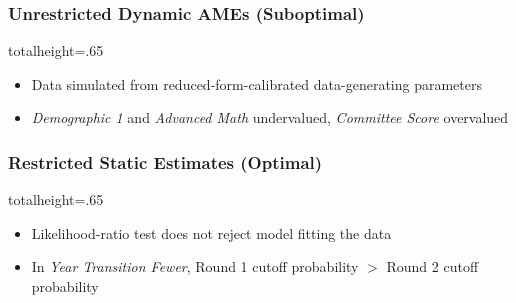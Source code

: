 \documentclass[12pt, aspectratio=169]{beamer}
\begin{document}
\begin{frame}[label=ydues]
\frametitle{Unrestricted Dynamic AMEs (Suboptimal)}
\addtocounter{framenumber}{-1}
\vspace{-5pt}
\begin{table}[htbp]
  \centering
  \begin{adjustbox}{totalheight=.65\textheight}

  \end{adjustbox}
\end{table}%
\begin{itemize}
\item Data simulated from reduced-form-calibrated data-generating parameters
\vspace{1.25pt}
\item \textit{Demographic 1} and \textit{Advanced Math} undervalued, \textit{Committee Score} overvalued
\vspace{1.25pt}
\end{itemize}
\hyperlink{ssss}{}
\hyperlink{fydues}{}
\hyperlink{ysues}{}
\end{frame}

\begin{frame}[label=ysreo]
\frametitle{Restricted Static Estimates (Optimal)}
\vspace{-5pt}
\begin{table}[htbp]
  \centering
  \begin{adjustbox}{totalheight=.65\textheight}

  \end{adjustbox}
\end{table}%
\begin{itemize}
\item Likelihood-ratio test does not reject model fitting the data
\vspace{1.25pt}
\item In \textit{Year Transition Fewer}, Round 1 cutoff probability $>$ Round 2 cutoff probability
\vspace{1.25pt}
\end{itemize}
\hyperlink{fysreo}{}
\hyperlink{ydreo}{}
\end{frame}
\end{document}
